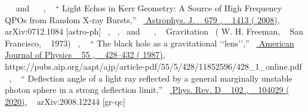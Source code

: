 \documentclass[aps,reprint,superscriptaddress,nofootinbib,floatfix,longbibliography,preprintnumbers]{revtex4-1}
\begin{document}
\begin{thebibliography}{139}
  \BibitemOpen
   { { \  } \  and \   { \  }, \  } {\enquote { {{Light Echos in Kerr Geometry: A Source of High Frequency QPOs from Random X-ray Bursts}},} \  }\href {\doibase 10.1086/587159} { { {Astrophys. J.} \  }  {679} , \   {1413} ( {2008})}, \   {arXiv:0712.1084 [astro-ph]} 
  \BibitemOpen
   { { \  },  { \  },  \  and \   { \  }, \  }\href@noop {} {  {{Gravitation}} } \  ( {W. H. Freeman}, \   {San Francisco}, \   {1973})
  \BibitemOpen
   { { \  }, \  } {\enquote { {{The black hole as a gravitational ‘‘lens’’}},} \  }\href {\doibase 10.1119/1.15126} { { {American Journal of Physics} \  }  {55} , \   {428--432} ( {1987})}, \   {https://pubs.aip.org/aapt/ajp/article-pdf/55/5/428/11852596/428\_1\_online.pdf} 
  \BibitemOpen
   { { \  }, \  } {\enquote { {{Deflection angle of a light ray reflected by a general marginally unstable photon sphere in a strong deflection limit}},} \  }\href {\doibase 10.1103/PhysRevD.102.104029} { { {Phys. Rev. D} \  }  {102} , \   {104029} ( {2020})}, \   {arXiv:2008.12244 [gr-qc]} 

\end{thebibliography}
\end{document}
